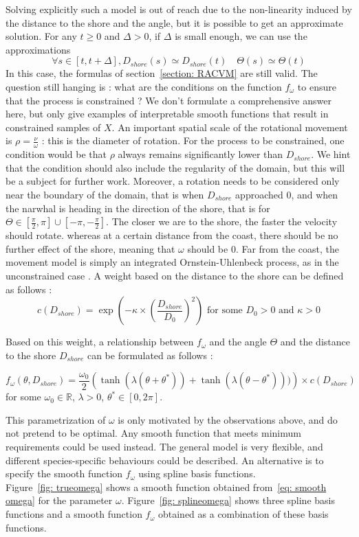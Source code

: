 \documentclass[11pt]{article}
\newcommand {\R}{\mathbb{R}}
\newcommand {\1}{\mathbb{1}}
\begin{document}
Solving explicitly such a model is out of reach due to the non-linearity induced by the distance to the shore and the angle, but it is possible to get an approximate solution.
For any $t \geq 0$ and $\Delta>0$, if $\Delta$ is small enough, we can use the approximations
\[\forall s \in [t,t+\Delta], D_{shore}(s) \simeq D_{shore}(t) \quad \Theta(s)\simeq \Theta(t)\]
In this case, the formulas of section~\ref{section: RACVM} are still valid.
The question still hanging is : what are the conditions on the function $f_{\omega}$ to ensure that the process is constrained ?
We don't formulate a comprehensive answer here, but only give examples of interpretable smooth functions that result in constrained samples of $X$.
An important spatial scale of the rotational movement is $\rho=\frac{\nu}{\omega}$ : this is the diameter of rotation. For the process to be constrained, one condition would be that $\rho$ always remains significantly lower than $D_{shore}$. We hint that the condition should also include the regularity of the domain, but this will be a subject for further work. Moreover, a rotation needs to be considered only near the boundary of the domain, that is when $D_{shore}$ approached $0$, and when the narwhal is heading in the direction of the shore, that is for $\Theta \in \left[\frac{\pi}{2},\pi\right] \cup \left[-\pi,-\frac{\pi}{2}\right]$.
The closer we are to the shore, the faster the velocity should rotate. 
whereas at a certain distance from the coast, there should be no further effect of the shore, meaning that $\omega$ should be $0$. Far from the coast, the movement model is simply an integrated Ornstein-Uhlenbeck process, as in the unconstrained case \cite{johnson_continuoustime_2008}.
A weight based on the distance to the shore can be defined as follows :
\[c(D_{shore})=\exp\left(-\kappa \times \left(\frac{D_{shore}}{D_0}\right)^2\right)\mbox{ for some } D_0>0 \mbox{ and } \kappa>0\]

Based on this weight, a relationship between $f_{\omega}$ and the angle $\Theta$ and the distance to the shore $D_{shore}$ can be formulated as follows :

\begin{equation}
f_{\omega}(\theta,D_{shore})=\frac{\omega_0}{2}\left(\tanh(\lambda(\theta+\theta^{*}))+\tanh(\lambda(\theta-\theta^{*})))\right)\times c(D_{shore})
\label{eq: smooth omega}
\end{equation}
for some $\omega_0 \in \R$, $\lambda>0$, $\theta^* \in [0,2\pi]$.

This parametrization of $\omega$ is only motivated by the observations above, and do not pretend to be optimal. Any smooth function that meets minimum requirements could be used instead. The general model is very flexible, and different species-specific behaviours could be described. An alternative is to specify the smooth function $f_{\omega}$ using spline basis functions. \\
Figure~\ref{fig: trueomega} shows a smooth function obtained from~\ref{eq: smooth omega} for the parameter $\omega$. Figure~\ref{fig: splineomega} shows three spline basis functions and a smooth function $f_{\omega}$ obtained as a combination of these basis functions.
\end{document}
